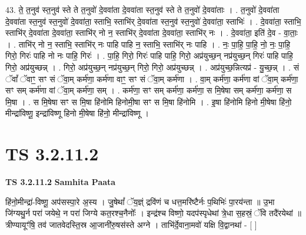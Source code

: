 \documentclass[17pt]{extarticle}
\begin{document}
43. ते॒ त॒नुव॑ स्त॒नुव॑ स्ते ते त॒नुवो॑ दे॒ववा॑ता दे॒ववा॑ता स्त॒नुव॑ स्ते ते त॒नुवो॑ दे॒ववा॑ताः । . त॒नुवो॑ दे॒ववा॑ता दे॒ववा॑ता स्त॒नुव॑ स्त॒नुवो॑ दे॒ववा॑ता॒ स्ताभि॒ स्ताभि॑र् दे॒ववा॑ता स्त॒नुव॑ स्त॒नुवो॑ दे॒ववा॑ता॒ स्ताभिः॑ । . दे॒ववा॑ता॒ स्ताभि॒ स्ताभि॑र् दे॒ववा॑ता दे॒ववा॑ता॒ स्ताभि॑र् नो न॒ स्ताभि॑र् दे॒ववा॑ता दे॒ववा॑ता॒ स्ताभि॑र् नः । . दे॒ववा॑ता॒ इति॑ दे॒व - वा॒ताः॒ । . ताभि॑र् नो न॒ स्ताभि॒ स्ताभि॑र् नः पाहि पाहि न॒ स्ताभि॒ स्ताभि॑र् नः पाहि । . नः॒ पा॒हि॒ पा॒हि॒ नो॒ नः॒ पा॒हि॒ गिरो॒ गिरः॑ पाहि नो नः पाहि॒ गिरः॑ । . पा॒हि॒ गिरो॒ गिरः॑ पाहि पाहि॒ गिरो॒ अप्र॑युच्छ॒न् नप्र॑युच्छ॒न् गिरः॑ पाहि पाहि॒ गिरो॒ अप्र॑युच्छन्न् । . गिरो॒ अप्र॑युच्छ॒न् नप्र॑युच्छ॒न् गिरो॒ गिरो॒ अप्र॑युच्छन्न् । . अप्र॑युच्छ॒न्नित्यप्र॑ - यु॒च्छ॒न्न् । . सं ॅवां᳚ ॅवाꣳ॒॒ सꣳ सं ॅवा॒म् कर्म॑णा॒ कर्म॑णा वाꣳ॒॒ सꣳ सं ॅवा॒म् कर्म॑णा । . वा॒म् कर्म॑णा॒ कर्म॑णा वां ॅवा॒म् कर्म॑णा॒ सꣳ सम् कर्म॑णा वां ॅवा॒म् कर्म॑णा॒ सम् । . कर्म॑णा॒ सꣳ सम् कर्म॑णा॒ कर्म॑णा॒ स मि॒षेषा सम् कर्म॑णा॒ कर्म॑णा॒ स मि॒षा । . स मि॒षेषा सꣳ स मि॒षा हि॑नोमि हिनोमी॒षा सꣳ स मि॒षा हि॑नोमि । . इ॒षा हि॑नोमि हिनो मी॒षेषा हि॑नो॒ मीन्द्रा॑विष्णू॒ इन्द्रा॑विष्णू हिनो मी॒षेषा हि॑नो॒ मीन्द्रा॑विष्णू । \newline
\pagebreak
{}

\section{ TS 3.2.11.2 }

\textbf{TS 3.2.11.2 } \newline
\textbf{Samhita Paata} \newline

हि॑नो॒मीन्द्रा॑-विष्णू॒ अप॑सस्पा॒रे अ॒स्य । जु॒षेथां᳚ ॅय॒ज्ञ्ं द्रवि॑णं च धत्त॒मरि॑ष्टैर्नः प॒थिभिः॑ पा॒रय॑न्ता ॥ उ॒भा जि॑ग्यथु॒र्न परा॑ जयेथे॒ न परा॑ जिग्ये कत॒रश्च॒नैनोः᳚ । इन्द्र॑श्च विष्णो॒ यदप॑स्पृधेथां त्रे॒धा स॒हस्रं॒ ॅवि तदै॑रयेथां ॥ त्रीण्यायूꣳ॑षि॒ तव॑ जातवेदस्ति॒स्र आ॒जानी॑रु॒षस॑स्ते अग्ने । ताभि॑र्दे॒वाना॒मवो॑ यक्षि वि॒द्वानथा॑ - [  ] \newline
\end{document}
